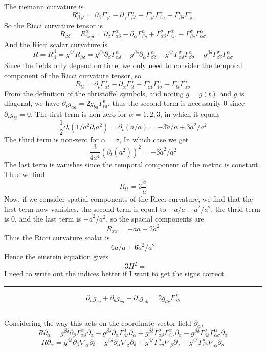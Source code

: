 The riemann curvature is
$$ R^\alpha_{\beta\gamma\delta} = \partial_\beta\Gamma^\alpha_{\gamma\delta} - \partial_\gamma\Gamma^\alpha_{\beta\delta}+\Gamma^\sigma_{\gamma\delta}\Gamma^\alpha_{\beta\sigma} - \Gamma^\sigma_{\beta\delta}\Gamma^\alpha_{\gamma\sigma} $$
So the Ricci curvature tensor is
$$ R_{\beta\delta} = R^\alpha_{\beta\alpha\delta} = \partial_\beta\Gamma^\alpha_{\alpha\delta} - \partial_\alpha\Gamma^\alpha_{\beta\delta}+\Gamma^\sigma_{\alpha\delta}\Gamma^\alpha_{\beta\sigma} - \Gamma^\sigma_{\beta\delta}\Gamma^\alpha_{\alpha\sigma} $$
And the Ricci scalar curvature is
$$ R = R_{\beta}^{\beta} = g^{\beta\delta}R_{\beta\delta} =
g^{\beta\delta}\partial_\beta\Gamma^\alpha_{\alpha\delta} -
g^{\beta\delta}\partial_\alpha\Gamma^\alpha_{\beta\delta}
+g^{\beta\delta}\Gamma^\sigma_{\alpha\delta}\Gamma^\alpha_{\beta\sigma} -
g^{\beta\delta}\Gamma^\sigma_{\beta\delta}\Gamma^\alpha_{\alpha\sigma} $$
Since the fields only depend on time, we only need to consider the temporal component of the Ricci curvature tensor, so
$$ R_{tt} = \partial_t \Gamma^{\alpha}_{\alpha t} - \partial_\alpha\Gamma^{\alpha}_{tt}
+ \Gamma^{\sigma}_{\alpha t}\Gamma^{\alpha}_{t \sigma} - \Gamma^{\sigma}_{tt}\Gamma^{\alpha}_{\alpha\sigma} $$
From the definition of the christoffel symbols, and noting $ g = g(t)$ and $g$ is diagonal, we have $\partial_t g_{aa} = 2g_{ba}\Gamma^b_{ta}$, thus
the second term is necessarily 0 since $\partial_t g_{tt} = 0$. The first term is non-zero for $\alpha = 1,2,3$, in which it equals 
$$ \frac{1}{2}\partial_t (1/a^2 \partial_t a^2) = \partial_t(\dot a / a) = -3\ddot a /a + 3\dot a^2 /a^2 $$
The third term is non-zero for $\alpha = \sigma$, In which case we get 
$$ \frac{3}{4a^4}(\partial_t (a^2))^2 =  -3\dot a^2/a^2  $$
The last term is vanishes since the temporal component of the metric is constant. Thus we find
$$ R_{tt} = 3\frac{\ddot a}{a}$$
Now, if we consider spatial components of the Ricci curvature, we find that the first term now vanishes, the second term is equal to $ -\ddot a/a - \dot a^2/a^2$, the thrid term is 0, and the last term is $-\dot a^2/a^2$, so the spacial components are
$$ R_{xx} = -\ddot a  a - 2\dot a^2$$
Thus the Ricci curvature scalar is
$$ 6\ddot a/a + 6\dot a^2/a^2 $$
Hence the einstein equation gives
$$ -3H^2 =  $$
I need to write out the indices better if I want to get the signs correct.

\hrule
$$ \partial_ag_{bc} + \partial_bg_{ca} - \partial_cg_{ab} = 2g_{dc}\Gamma^d_{ab} $$

\hrule
Considering the way this acts on the coordinate vector field $\partial_\alpha$, 
$$ R\partial_\alpha =
g^{\beta\delta}\partial_\beta\Gamma^\alpha_{\alpha\delta}\partial_\alpha -
g^{\beta\delta}\partial_\alpha\Gamma^\alpha_{\beta\delta}\partial_\alpha
+g^{\beta\delta}\Gamma^\sigma_{\alpha\delta}\Gamma^\alpha_{\beta\sigma}\partial_\alpha -
g^{\beta\delta}\Gamma^\sigma_{\beta\delta}\Gamma^\alpha_{\alpha\sigma} \partial_\alpha $$
$$ R\partial_\alpha =
g^{\beta\delta}\partial_\beta \nabla_\alpha\partial_\delta -
g^{\beta\delta}\partial_\alpha \nabla_\beta\partial_\delta
+g^{\beta\delta}\Gamma^\sigma_{\alpha\delta} \nabla_\beta\partial_\sigma -
g^{\beta\delta}\Gamma^\sigma_{\beta\delta} \nabla_\alpha \partial_\sigma $$
